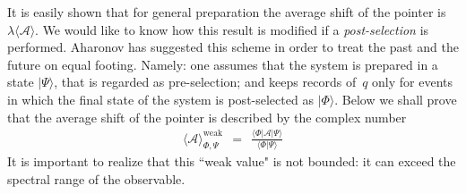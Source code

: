 \documentclass[onecolumn,fleqn]{revtex4}
\newcommand{\tbox}[1]{\text{#1}}
\newcommand{\beq}{\begin{eqnarray}}
\newcommand{\eeq}{\end{eqnarray}}
\begin{document}
It is easily shown that for general preparation 
the average shift of the pointer 
is ${\lambda \langle \mathcal{A} \rangle}$. 
We would like to know how this result is modified 
if a {\em post-selection} is performed. 
Aharonov has suggested this scheme in order to treat 
the past and the future on equal footing. 
Namely: one assumes that the system is prepared in a state $|\Psi\rangle$, 
that is regarded as pre-selection; 
and keeps records of~$q$ only for events 
in which the final state of the system is post-selected as $|\Phi\rangle$.   
Below we shall prove that the average shift of the pointer 
is described by the complex number 
\beq
\langle\mathcal{A}\rangle_{\Phi,\Psi}^{\tbox{weak}} 
\ \ = \ \  
\frac{ \langle \Phi |\mathcal{A}| \Psi \rangle}
{\langle \Phi | \Psi \rangle}
\eeq
It is important to realize that this ``weak value" is not bounded:
it can exceed the spectral range of the observable. 
\end{document}
